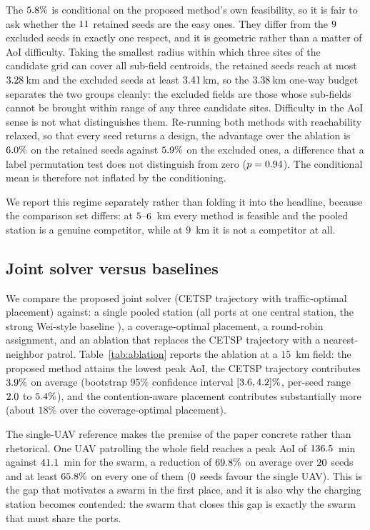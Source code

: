 The $5.8\%$ is conditional on the proposed method's own feasibility, so it is fair
to ask whether the $11$ retained seeds are the easy ones. They differ from the
$9$ excluded seeds in exactly one respect, and it is geometric rather than a
matter of AoI difficulty. Taking the smallest radius within which three sites of the
candidate grid can cover all sub-field centroids, the retained seeds reach at most
$3.28$\,km and the excluded seeds at least $3.41$\,km, so the
$3.38$\,km one-way budget separates the two groups cleanly: the excluded fields are
those whose sub-fields cannot be brought within range of any three candidate sites.
Difficulty in the AoI sense is not what distinguishes them. Re-running both methods with
reachability relaxed, so that every seed returns a design, the advantage over the
ablation is $6.0\%$ on the retained seeds against $5.9\%$ on the
excluded ones, a difference that a label permutation test does not distinguish from zero
($p=0.94$). The conditional mean is therefore not inflated by the conditioning.

We report this regime separately rather than folding it into the headline, because the
comparison set differs: at $5$--$6$~km every method is feasible and the pooled
station is a genuine competitor, while at $9$~km it is not a competitor at all.

\subsection{Joint solver versus baselines}
We compare the proposed joint solver (CETSP trajectory with traffic-optimal
placement) against: a single pooled station (all ports at one central station,
the strong Wei-style baseline \cite{wei2024}), a coverage-optimal placement, a
round-robin assignment, and an ablation that replaces the CETSP trajectory with
a nearest-neighbor patrol. Table~\ref{tab:ablation} reports the ablation at a
$15$~km field: the proposed method attains the lowest peak AoI, the CETSP
trajectory contributes $3.9\%$ on average (bootstrap $95\%$ confidence interval
$[3.6,4.2]\%$, per-seed range $2.0$ to $5.4\%$), and the
contention-aware placement contributes substantially more (about $18\%$ over the
coverage-optimal placement).

The single-UAV reference makes the premise of the paper concrete rather than rhetorical.
One UAV patrolling the whole field reaches a peak AoI of $136.5$~min against
$41.1$~min for the swarm, a reduction of $69.8\%$ on average over
$20$ seeds and at least $65.8\%$ on every one of them
($0$ seeds favour the single UAV). This is the gap that motivates a swarm
in the first place, and it is also why the charging station becomes contended: the
swarm that closes this gap is exactly the swarm that must share the ports.

